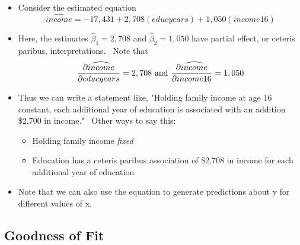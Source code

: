 \documentclass[11pt]{article}
\begin{document}
\begin{itemize}
\item Consider the estimated equation%
\begin{equation*}
\widehat{income}=-17,431+2,708(educyears)+1,050(income16)
\end{equation*}

\item Here, the estimates $\widehat{\beta }_{1}=2,708$ and $\widehat{\beta }%
_{2}=1,050$ have partial effect, or ceteris paribus, interpretations. \ Note
that 
\begin{equation*}
\frac{\partial \widehat{income}}{\partial educyears}=2,708\text{ and }\frac{%
\partial \widehat{income}}{\partial income16}=1,050
\end{equation*}

\item Thus we can write a statement like, "Holding family income at age 16
constant, each additional year of education is associated with an addition
\$2,700 in income." \ Other ways to say this:

\begin{itemize}
\item Holding family income \textit{fixed}

\item Education has a ceteris paribus association of \$2,708 in income for
each additional year of education
\end{itemize}

\item Note that we can also use the equation to generate predictions about y
for different values of x.
\end{itemize}

\subsection{Goodness of Fit}
\end{document}
